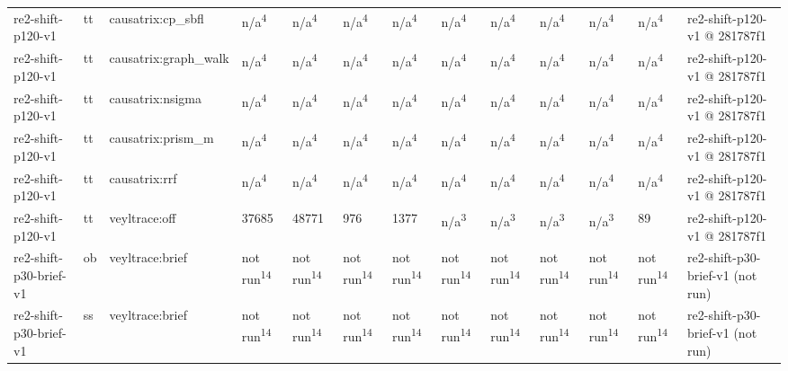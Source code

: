 \begin{table}[t]
\begin{tabular}{lllllllllllll}
re2-shift-p120-v1 & tt & causatrix:cp\_sbfl & n/a\textsuperscript{4} & n/a\textsuperscript{4} & n/a\textsuperscript{4} & n/a\textsuperscript{4} & n/a\textsuperscript{4} & n/a\textsuperscript{4} & n/a\textsuperscript{4} & n/a\textsuperscript{4} & n/a\textsuperscript{4} & re2-shift-p120-v1 @ 281787f1 \\
re2-shift-p120-v1 & tt & causatrix:graph\_walk & n/a\textsuperscript{4} & n/a\textsuperscript{4} & n/a\textsuperscript{4} & n/a\textsuperscript{4} & n/a\textsuperscript{4} & n/a\textsuperscript{4} & n/a\textsuperscript{4} & n/a\textsuperscript{4} & n/a\textsuperscript{4} & re2-shift-p120-v1 @ 281787f1 \\
re2-shift-p120-v1 & tt & causatrix:nsigma & n/a\textsuperscript{4} & n/a\textsuperscript{4} & n/a\textsuperscript{4} & n/a\textsuperscript{4} & n/a\textsuperscript{4} & n/a\textsuperscript{4} & n/a\textsuperscript{4} & n/a\textsuperscript{4} & n/a\textsuperscript{4} & re2-shift-p120-v1 @ 281787f1 \\
re2-shift-p120-v1 & tt & causatrix:prism\_m & n/a\textsuperscript{4} & n/a\textsuperscript{4} & n/a\textsuperscript{4} & n/a\textsuperscript{4} & n/a\textsuperscript{4} & n/a\textsuperscript{4} & n/a\textsuperscript{4} & n/a\textsuperscript{4} & n/a\textsuperscript{4} & re2-shift-p120-v1 @ 281787f1 \\
re2-shift-p120-v1 & tt & causatrix:rrf & n/a\textsuperscript{4} & n/a\textsuperscript{4} & n/a\textsuperscript{4} & n/a\textsuperscript{4} & n/a\textsuperscript{4} & n/a\textsuperscript{4} & n/a\textsuperscript{4} & n/a\textsuperscript{4} & n/a\textsuperscript{4} & re2-shift-p120-v1 @ 281787f1 \\
re2-shift-p120-v1 & tt & veyltrace:off & 37685 & 48771 & 976 & 1377 & n/a\textsuperscript{3} & n/a\textsuperscript{3} & n/a\textsuperscript{3} & n/a\textsuperscript{3} & 89 & re2-shift-p120-v1 @ 281787f1 \\
re2-shift-p30-brief-v1 & ob & veyltrace:brief & not run\textsuperscript{14} & not run\textsuperscript{14} & not run\textsuperscript{14} & not run\textsuperscript{14} & not run\textsuperscript{14} & not run\textsuperscript{14} & not run\textsuperscript{14} & not run\textsuperscript{14} & not run\textsuperscript{14} & re2-shift-p30-brief-v1 (not run) \\
re2-shift-p30-brief-v1 & ss & veyltrace:brief & not run\textsuperscript{14} & not run\textsuperscript{14} & not run\textsuperscript{14} & not run\textsuperscript{14} & not run\textsuperscript{14} & not run\textsuperscript{14} & not run\textsuperscript{14} & not run\textsuperscript{14} & not run\textsuperscript{14} & re2-shift-p30-brief-v1 (not run) \\

\end{tabular}
\end{table}
